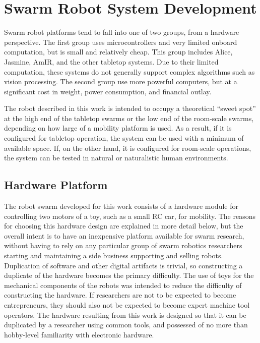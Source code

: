 \chapter{Swarm Robot System Development}
\thispagestyle{fancy}

Swarm robot platforms tend to fall into one of two groups, from a hardware perspective. 
The first group uses microcontrollers and very limited onboard computation, but is small and relatively cheap.
This group includes Alice, Jasmine, AmIR, and the other tabletop systems. 
Due to their limited computation, these systems do not generally support complex algorithms such as vision processing. 
The second group use more powerful computers, but at a significant cost in weight, power consumption, and financial outlay.

The robot described in this work is intended to occupy a theoretical ``sweet spot'' at the high end of the tabletop swarms or the low end of the room-scale swarms, depending on how large of a mobility platform is used. 
As a result, if it is configured for tabletop operation, the system can be used with a minimum of available space. 
If, on the other hand, it is configured for room-scale operations, the system can be tested in natural or naturalistic human environments. 

\section{Hardware Platform}

The robot swarm developed for this work consists of a hardware module for controlling two motors of a toy, such as a small RC car, for mobility. 
The reasons for choosing this hardware design are explained in more detail below, but the overall intent is to have an inexpensive platform available for swarm research, without having to rely on any particular group of swarm robotics researchers starting and maintaining a side business supporting and selling robots.
Duplication of software and other digital artifacts is trivial, so constructing a duplicate of the hardware becomes the primary difficulty. 
The use of toys for the mechanical components of the robots was intended to reduce the difficulty of constructing the hardware. 
If researchers are not to be expected to become entrepreneurs, they should also not be expected to become expert machine tool operators.
The hardware resulting from this work is designed so that it can be duplicated by a researcher using common tools, and possessed of no more than hobby-level familiarity with electronic hardware.

